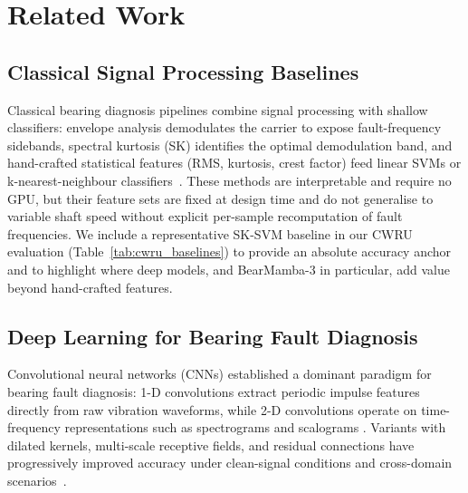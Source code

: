 
\section{Related Work}
\label{sec:related}

\subsection{Classical Signal Processing Baselines}
\label{subsec:rel_classical}

Classical bearing diagnosis pipelines combine signal processing with shallow
classifiers: envelope analysis demodulates the carrier to expose
fault-frequency sidebands, spectral kurtosis (SK) identifies the optimal
demodulation band, and hand-crafted statistical features (RMS, kurtosis,
crest factor) feed linear SVMs or k-nearest-neighbour
classifiers~\cite{antoni2006spectral_kurtosis,randall2011rolling}.
These methods are interpretable and require no GPU, but their feature sets
are fixed at design time and do not generalise to variable shaft speed without
explicit per-sample recomputation of fault frequencies.
We include a representative SK-SVM baseline in our CWRU evaluation
(Table~\ref{tab:cwru_baselines}) to provide an absolute accuracy anchor
and to highlight where deep models, and BearMamba-3 in particular, add value
beyond hand-crafted features.

\subsection{Deep Learning for Bearing Fault Diagnosis}
\label{subsec:rel_dl}

Convolutional neural networks (CNNs) established a dominant paradigm for
bearing fault diagnosis: 1-D convolutions extract periodic impulse features
directly from raw vibration waveforms, while 2-D convolutions operate on
time-frequency representations such as spectrograms and scalograms
\cite{wen2018new,zhang2020deep,zhang2019resnet,hoang2019survey}.
Variants with dilated kernels, multi-scale receptive fields, and residual
connections have progressively improved accuracy under clean-signal
conditions and cross-domain scenarios~\cite{guo2020deep,zhuyun2020cscoh,li2020systematic,jiao2020cnn_review}.

